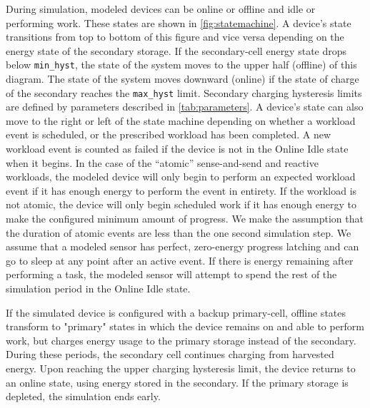 During simulation, modeled devices can be online or offline and idle or performing
work. These states are shown in \cref{fig:statemachine}.  A device's state
transitions from top to bottom of this figure and vice versa depending on the
energy state of the secondary storage.
If the secondary-cell energy state drops below \texttt{min\_hyst},
the state of the system moves to the upper
half (offline) of this diagram. The state of the system moves downward (online)
if the state of charge of the secondary reaches the \texttt{max\_hyst}
limit. Secondary charging hysteresis limits are defined by parameters described in \cref{tab:parameters}.
A device's state can also move
to the right or left of the state machine depending on whether a workload event
is scheduled, or the prescribed workload has been completed. A new
workload event is counted as failed if the device is not in the \textsf{Online
Idle} state when it begins.
In the case of the ``atomic''
sense-and-send and reactive workloads, the modeled device will only begin
to perform an expected workload event if it has
enough energy to perform the event in entirety. If the workload is not atomic,
the device will only begin scheduled work if it has enough energy to make the
configured minimum amount of progress. We
make the assumption that the duration of atomic events are less than the one
second simulation step.
We assume that a modeled sensor has perfect, zero-energy progress
latching and can go to sleep at any point after an active event. If
there is energy remaining after performing a task, the modeled sensor will
attempt to spend the rest of the simulation period in the \textsf{Online Idle} state.

If the simulated device is configured with a backup primary-cell, offline
states transform to "primary" states in which the device remains on and
able to perform work, but charges energy usage to the primary storage instead
of the secondary. During these periods, the secondary cell continues charging
from harvested energy. Upon reaching the upper charging hysteresis
limit, the device returns to an online state, using energy stored in the
secondary.  If the primary storage is depleted, the simulation ends early.

